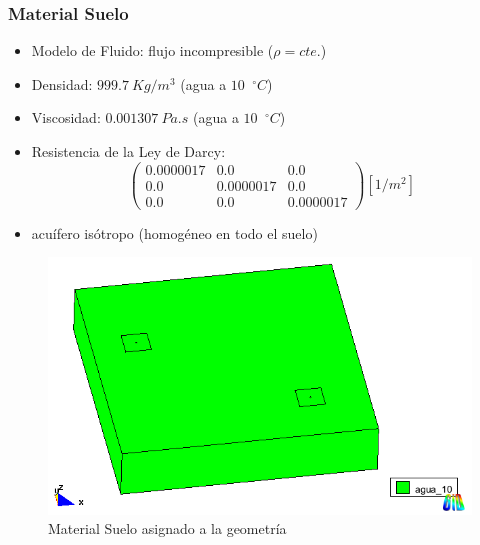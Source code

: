 \documentclass[spanish]{beamer}
\newcommand{\grad}{\hspace{-2mm}$\phantom{a}^{\circ}$} %
\begin{document}
\subsubsection{Material Suelo}
\begin{frame}
\begin{itemize}
\item Modelo de Fluido: flujo incompresible ($\rho = cte.$)
\item Densidad: $999.7~Kg/m^3$ (agua a $10$\grad$C$)
\item Viscosidad: $0.001307~Pa.s$ (agua a $10$\grad$C$)
\item Resistencia de la Ley de Darcy:
\begin{equation}
\begin{pmatrix}{}
0.0000017 & 0.0 & 0.0 \\ 
0.0 & 0.0000017 & 0.0 \\ 
0.0 & 0.0 & 0.0000017
\end{pmatrix} [1/m^2]
\label{matrizdarcys}
\end{equation}
\item acuífero isótropo (homogéneo en todo el suelo)
\end{itemize}
\end{frame}
%
\begin{frame}
\begin{center}
\begin{figure}[tbhp]
\centerline{\includegraphics[scale=0.4]{../img/100m/100_perspectiva_material_agua}}
\caption{Material Suelo asignado a la geometría}
\label{100_perspectiva_material_agua}
\end{figure}
\end{center}
\end{frame}
%
\end{document}

